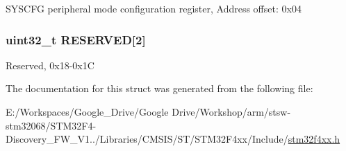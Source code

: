 S\-Y\-S\-C\-F\-G peripheral mode configuration register, Address offset\-: 0x04 \hypertarget{struct_s_y_s_c_f_g___type_def_afaf27b66c1edc60064db3fa6e693fb59}{
\subsubsection[{R\-E\-S\-E\-R\-V\-E\-D}]{\setlength{\rightskip}{0pt plus 5cm}uint32\-\_\-t R\-E\-S\-E\-R\-V\-E\-D\mbox{[}2\mbox{]}}}\label{struct_s_y_s_c_f_g___type_def_afaf27b66c1edc60064db3fa6e693fb59}
Reserved, 0x18-\/0x1\-C 

The documentation for this struct was generated from the following file\-:\begin{DoxyCompactItemize}
\item 
E\-:/\-Workspaces/\-Google\-\_\-\-Drive/\-Google Drive/\-Workshop/arm/stsw-\/stm32068/\-S\-T\-M32\-F4-\/\-Discovery\-\_\-\-F\-W\-\_\-\-V1../\-Libraries/\-C\-M\-S\-I\-S/\-S\-T/\-S\-T\-M32\-F4xx/\-Include/\hyperlink{stm32f4xx_8h}{stm32f4xx.\-h}\end{DoxyCompactItemize}
